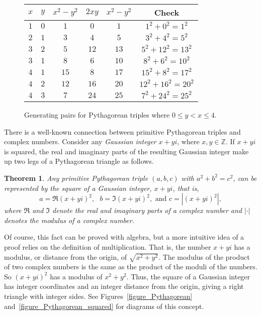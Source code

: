 \documentclass[12pt,table]{article}
\newtheorem{theorem}{Theorem}[section]
\theoremstyle{definition}
\theoremstyle{remark}
\newcommand{\Zzz}{\mathbb Z}
\numberwithin{equation}{section}
\begin{document}
\begin{figure}
\begin{center}
\begin{tabular}{ c|c|c|c|c|c } 

 $x$ & $y$ & $x^2 - y^2$ & $2xy$ & $x^2 - y^2$ & Check \\  
 \hline
 $1$ & $0$ & $1$ & $0$ & $1$ & $1^2 + 0^2 = 1^2$ \\  
 $2$ & $1$ & $3$ & $4$ & $5$ & $3^2 + 4^2 = 5^2$ \\  
 $3$ & $2$ & $5$ & $12$ & $13$ & $5^2 + 12^2 = 13^2$ \\  
 $3$ & $1$ & $8$ & $6$ & $10$ & $8^2 + 6^2 = 10^2$ \\  
 $4$ & $1$ & $15$ & $8$ & $17$ & $15^2 + 8^2 = 17^2$ \\  
 $4$ & $2$ & $12$ & $16$ & $20$ & $12^2 + 16^2 = 20^2$ \\  
 $4$ & $3$ & $7$ & $24$ & $25$ & $7^2 + 24^2 = 25^2$ \\  
\end{tabular}
\caption{Generating pairs for Pythagorean triples where
$0 \leq y < x \leq 4$.}
\end{center}
\label{figure_triples}
\end{figure}







There is a well-known connection between primitive Pythagorean triples
and complex numbers. Consider any {\em Gaussian integer} $x+yi$,
where $x, y \in \Zzz$.
If $x + yi$  is squared, the real and imaginary
parts of the resulting Gaussian integer make up two legs of
a Pythagorean triangle as follows. 


\begin{theorem}
Any primitive Pythagorean triple $(a,b,c)$ with
$a^2 + b^2 = c^2$, can be represented
by the square of a Gaussian integer, $x+yi$,
that is,
$$
    a =  \Re{(x+yi)^2},  \:\:\: b = \Im{(x+yi)^2},
    \mbox{   and   }
    c = |(x+yi)^2|,
$$
where $\Re$ and $\Im$ denote the real and imaginary parts of a complex number
and
$| \cdot |$ denotes the modulus of a complex number.
\end{theorem}



Of course, this fact can be proved with
algebra, but a more intuitive 
idea of a proof relies on the definition 
of multiplication. That is, the number $x+yi$ has a modulus, or     
distance from the origin, of $\sqrt{x^2+y^2}$. The modulus of the       
product of two complex numbers is the same as the product of
the moduli of the numbers.
So $(x+yi)^2$ has a modulus of $x^2+y^2$. Thus, the square of a 
Gaussian integer has integer coordinates and an integer distance
from the origin, giving a right triangle with integer sides.
See Figures~\ref{figure_Pythagorean} 
and~\ref{figure_Pythagorean_squared} for diagrams of this 
concept.
\end{document}
